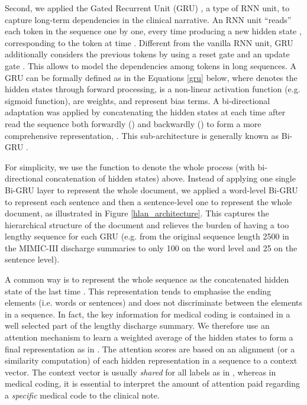 \documentclass[final,5p,times,twocolumn]{elsarticle}
\begin{document}
Second, we applied the Gated Recurrent Unit (GRU) \cite{cho2014}, a type of RNN unit, to capture long-term dependencies in the clinical narrative. An RNN unit ``reads'' each token in the sequence one by one, every time producing a new hidden state , corresponding to the token at time . Different from the vanilla RNN unit, GRU additionally considers the previous tokens by using a reset gate  and an update gate . This allows to model the dependencies among tokens in long sequences. A GRU can be formally defined as in the Equations \ref{gru} below, where  denotes the hidden states through forward processing,  is a non-linear activation function (e.g. sigmoid function),  are weights, and  represent bias terms. A bi-directional adaptation was applied by concatenating the hidden states at each time after read the sequence both forwardly () and backwardly () to form a more comprehensive representation, . This sub-architecture is generally known as Bi-GRU \cite{cho2014}.

For simplicity, we use the function  to denote the whole process (with bi-directional concatenation of hidden states) above. Instead of applying one single Bi-GRU layer to represent the whole document, we applied a word-level Bi-GRU to represent each sentence and then a sentence-level one to represent the whole document, as illustrated in Figure \ref{hlan_architecture}. This captures the hierarchical structure of the document and relieves the burden of having a too lengthy sequence for each GRU \cite{baumel2018multi} (e.g. from the original sequence length 2500 in the MIMIC-III discharge summaries to only 100 on the word level and 25 on the sentence level).

A common way is to represent the whole sequence as the concatenated hidden state  of the last time . This representation tends to emphasise the ending elements (i.e. words or sentences) and does not discriminate between the elements in a sequence. In fact, the key information for medical coding is contained in a well selected part of the lengthy discharge summary. We therefore use an attention mechanism to learn a weighted average of the hidden states to form a final representation as in \cite{yang2016,bahdanau2014}. The attention scores are based on an alignment (or a similarity computation) of each hidden representation in a sequence to a context vector. The context vector is usually \textit{shared} for all labels as in \cite{yang2016,dong2020}, whereas in medical coding, it is essential to interpret the amount of attention paid regarding a \textit{specific} medical code to the clinical note.
\end{document}
